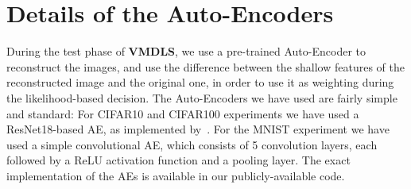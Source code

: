 \documentclass[accepted]{uai2022} %
\begin{document}
\section{Details of the Auto-Encoders}
During the test phase of \textbf{VMDLS}, we use a pre-trained Auto-Encoder to reconstruct the images,
and use the difference between the shallow features of the reconstructed image and the original one, in order to use it as weighting during the likelihood-based decision.
The Auto-Encoders we have used are fairly simple and standard:
For CIFAR10 and CIFAR100 experiments we have used a ResNet18-based AE, as implemented by~\citep{Falcon:github:2019:pytorch}.
For the MNIST experiment we have used a simple convolutional AE, which consists of 5 convolution layers, each followed by a ReLU activation function and a pooling layer.
The exact implementation of the AEs is available in our publicly-available code. 

% 
%
% 

%
\end{document}
